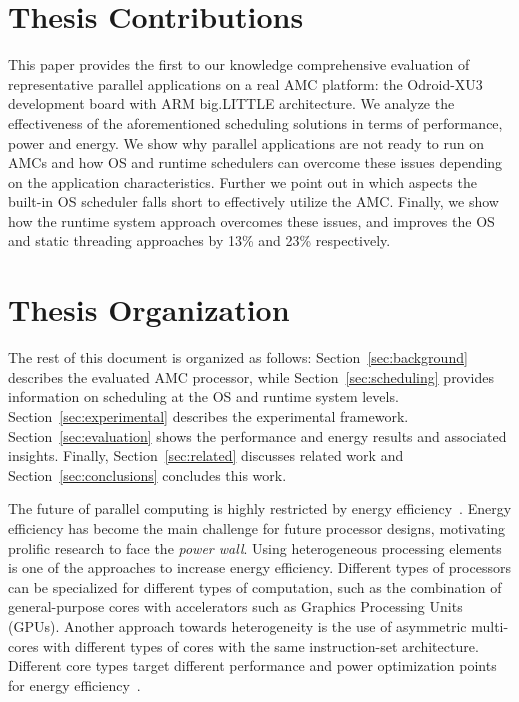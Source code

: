 \section{Thesis Contributions}
This paper provides the first to our knowledge comprehensive evaluation of representative parallel applications on a real AMC platform: the Odroid-XU3 development board with ARM big.LITTLE architecture.
We analyze the effectiveness of the aforementioned scheduling solutions in terms of performance, power and energy.
We show why parallel applications are not ready to run on AMCs and how OS and runtime schedulers can overcome these issues depending on the application characteristics.
Further we point out in which aspects the built-in OS scheduler falls short to effectively utilize the AMC.
Finally, we show how the runtime system approach overcomes these issues, and improves the OS and static threading approaches by 13\% and 23\% respectively.




\section{Thesis Organization}
The rest of this document is organized as follows: Section~\ref{sec:background} describes the evaluated AMC processor, while Section~\ref{sec:scheduling} provides information on 
scheduling at the OS and runtime system levels. 
Section~\ref{sec:experimental} describes the experimental framework. 
Section~\ref{sec:evaluation} shows the performance and energy results and associated insights.%
Finally, Section~\ref{sec:related} discusses related work and Section~\ref{sec:conclusions} concludes this work. 





\iffalse

The future of parallel computing is highly restricted by energy 
efficiency~\cite{Kogge_Exascale_TR08}. Energy efficiency has become the main 
challenge for future processor designs, motivating prolific research to face the 
\emph{power wall}. Using heterogeneous processing elements is one of the 
approaches to increase energy efficiency. Different types of processors can 
be specialized for different types of computation, such as the combination of 
general-purpose cores with accelerators such as Graphics Processing Units (GPUs). 
Another approach towards heterogeneity is the use of asymmetric multi-cores 
with different types of cores with the same instruction-set architecture. Different core types 
target different performance and power optimization points for energy
efficiency~\cite{Kumar:ISCA2004,Balakrishnan:ISCA2005}. 

